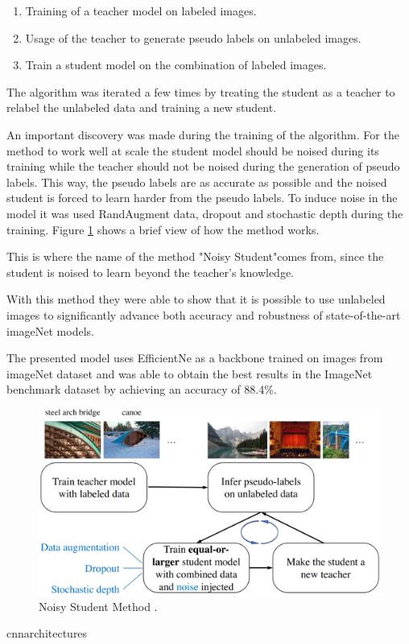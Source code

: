 \begin{enumerate}
    \item Training of a teacher model on labeled images.
    \item Usage of the teacher to generate pseudo labels on unlabeled images.
    \item Train a student model on the combination of labeled images.
\end{enumerate}

\par The algorithm was iterated a few times by treating the student as a teacher to relabel the unlabeled data and training a new student.

\par An important discovery was made during the training of the algorithm. For the method to work well at scale the student model should be noised during its training while the teacher should not be noised during the generation of pseudo labels. This way, the pseudo labels are as accurate as possible and the noised student is forced to learn harder from the pseudo labels. To induce noise in the model it was used RandAugment data, dropout and stochastic depth during the training. Figure \ref{fig:noisestudent} shows a brief view of how the method works.
\par This is where the name of the method "Noisy Student"comes from, since the student is noised to learn beyond the teacher's knowledge.
\par With this method they were able to show that it is possible to use unlabeled images to significantly advance both accuracy and robustness of state-of-the-art imageNet models.
\par The presented model uses EfficientNe as a backbone trained on images from imageNet dataset and was able to obtain the best results in the ImageNet benchmark dataset by achieving an accuracy of 88.4\%.



\begin{figure}[htb]
    \centering
    \includegraphics[scale = 0.15]{Sections/2StateOfTheArt/2_images/noisy_student.png}
    \caption{Noisy Student Method \cite{Xie2019}.} 
    \label{fig:noisestudent}
\end{figure}cnnarchitectures


